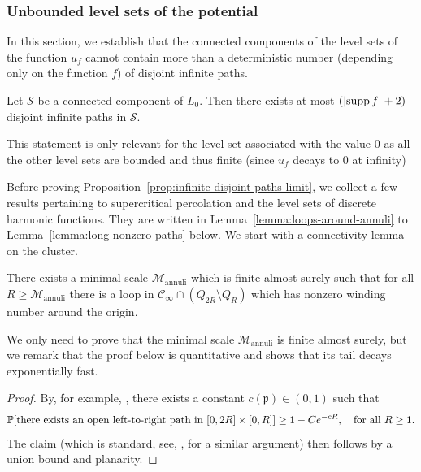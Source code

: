 \documentclass[12pt]{amsart}
\numberwithin{equation}{section}
\begin{document}
	\subsubsection{Unbounded level sets of the potential} \label{subsubsec:unboundedlevelsets}
	In this section, we establish that the connected components of the level sets of the function $u_f$ cannot contain more than a deterministic number (depending only on the function $f$) of disjoint infinite paths. 
	
	
	
	
	\begin{prop} \label{prop:infinite-disjoint-paths-limit}
		Let $\mathcal{S}$ be a connected component of $L_0$. Then there exists at most $(\left| \supp f \right|+2)$ disjoint infinite paths in $\mathcal{S}$. 
	\end{prop}
	
	\begin{remark}
		This statement is only relevant for the level set associated with the value $0$ as all the other level sets are bounded and thus finite (since $u_f$ decays to $0$ at infinity)
	\end{remark}
	
	Before proving Proposition~\ref{prop:infinite-disjoint-paths-limit}, we collect a few results pertaining to supercritical percolation and the level sets of discrete harmonic functions. They are written in Lemma~\ref{lemma:loops-around-annuli} to Lemma~\ref{lemma:long-nonzero-paths} below. We start with a connectivity lemma on the cluster. 
	\begin{lemma} \label{lemma:loops-around-annuli}
		There exists a minimal scale $\mathcal{M}_{\mathrm{annuli}}$ which is finite almost surely such that for all $R  \geq \mathcal{M}_{\mathrm{annuli} }$
		there is a loop in $\mathscr{C}_{\infty} \cap (Q_{2 R} \setminus Q_R)$ which has nonzero winding number around the origin.
	\end{lemma}
	
	\begin{remark}
		We only need to prove that the minimal scale $\mathcal{M}_{\mathrm{annuli} }$ is finite almost surely, but we remark that the proof below is quantitative and shows that its tail decays exponentially fast.
	\end{remark}
	
	\begin{proof}
		By, for example, \cite[Theorem 11.1 and (11.5)]{kesten-book}, there exists a constant $c(\mathfrak{p}) \in (0,1)$ such that 
		\[
		\P[\mbox{there exists an open left-to-right path in $[0 , 2R] \times [0 , R]$}] \geq 1- C e^{-c R}, \quad \mbox{for all $R \geq 1$}. 
		\]
		The claim (which is standard, see, \eg, \cite{grimmett-long-paths} for a similar argument) then follows by a union bound and planarity. 
	\end{proof}
	
\end{document}
